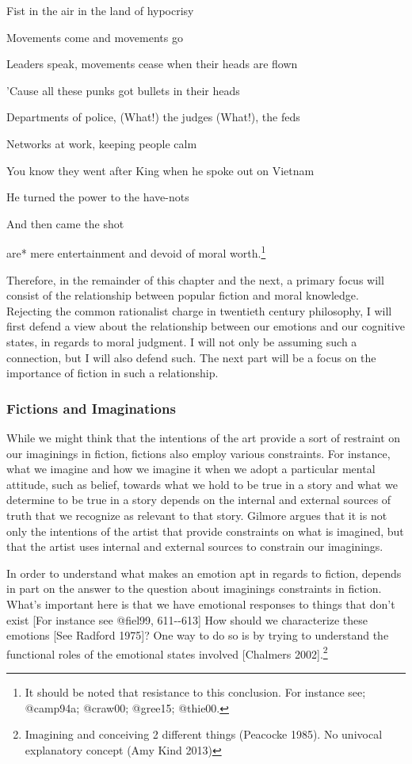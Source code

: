 \documentclass[
  letterpaper,
  DIV=11,
  numbers=noendperiod]{scrartcl}
\theoremstyle{remark}
\begin{document}
Fist in the air in the land of hypocrisy

Movements come and movements go

Leaders speak, movements cease when their heads are flown

'Cause all these punks got bullets in their heads

Departments of police, (What!) the judges (What!), the feds

Networks at work, keeping people calm

You know they went after King when he spoke out on Vietnam

He turned the power to the have-nots

And then came the shot

\noindent *are* mere entertainment and devoid of moral worth.\footnote{It
  should be noted that resistance to this conclusion. For instance see;
  @camp94a; @craw00; @gree15; @thie00.}

Therefore, in the remainder of this chapter and the next, a primary
focus will consist of the relationship between popular fiction and moral
knowledge. Rejecting the common rationalist charge in twentieth century
philosophy, I will first defend a view about the relationship between
our emotions and our cognitive states, in regards to moral judgment. I
will not only be assuming such a connection, but I will also defend
such. The next part will be a focus on the importance of fiction in such
a relationship.

\subsubsection*{Fictions and
Imaginations}\label{fictions-and-imaginations}

While we might think that the intentions of the art provide a sort of
restraint on our imaginings in fiction, fictions also employ various
constraints. For instance, what we imagine and how we imagine it when we
adopt a particular mental attitude, such as belief, towards what we hold
to be true in a story and what we determine to be true in a story
depends on the internal and external sources of truth that we recognize
as relevant to that story. Gilmore argues that it is not only the
intentions of the artist that provide constraints on what is imagined,
but that the artist uses internal and external sources to constrain our
imaginings.

In order to understand what makes an emotion apt in regards to fiction,
depends in part on the answer to the question about imaginings
constraints in fiction. What's important here is that we have emotional
responses to things that don't exist {[}For instance see @fiel99,
611-\/-613{]} How should we characterize these emotions {[}See Radford
1975{]}? One way to do so is by trying to understand the functional
roles of the emotional states involved {[}Chalmers 2002{]}.\footnote{Imagining
  and conceiving 2 different things (Peacocke 1985). No univocal
  explanatory concept (Amy Kind 2013)}
\end{document}
